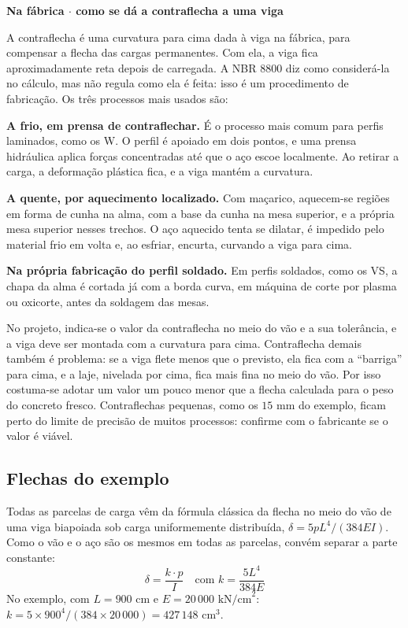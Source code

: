 \documentclass[11pt,a4paper]{article}
\newcommand{\caixaconceito}[2]{%
  \par\vspace{6pt}\noindent\colorbox{calloutbg}{%
    \parbox{\dimexpr\linewidth-2\fboxsep\relax}{%
      \vspace{4pt}\textbf{\color{primary}#1}\par\vspace{3pt}#2\vspace{4pt}%
    }%
  }\par\vspace{6pt}%
}
\begin{document}
\caixaconceito{Na fábrica $\cdot$ como se dá a contraflecha a uma viga}{%
A contraflecha é uma curvatura para cima dada à viga na fábrica, para compensar a flecha das cargas permanentes. Com ela, a viga fica aproximadamente reta depois de carregada. A NBR 8800 diz como considerá-la no cálculo, mas não regula como ela é feita: isso é um procedimento de fabricação. Os três processos mais usados são:\par\vspace{4pt}
\textbf{A frio, em prensa de contraflechar.} É o processo mais comum para perfis laminados, como os W. O perfil é apoiado em dois pontos, e uma prensa hidráulica aplica forças concentradas até que o aço escoe localmente. Ao retirar a carga, a deformação plástica fica, e a viga mantém a curvatura.\par
\textbf{A quente, por aquecimento localizado.} Com maçarico, aquecem-se regiões em forma de cunha na alma, com a base da cunha na mesa superior, e a própria mesa superior nesses trechos. O aço aquecido tenta se dilatar, é impedido pelo material frio em volta e, ao esfriar, encurta, curvando a viga para cima.\par
\textbf{Na própria fabricação do perfil soldado.} Em perfis soldados, como os VS, a chapa da alma é cortada já com a borda curva, em máquina de corte por plasma ou oxicorte, antes da soldagem das mesas.\par\vspace{4pt}
No projeto, indica-se o valor da contraflecha no meio do vão e a sua tolerância, e a viga deve ser montada com a curvatura para cima. Contraflecha demais também é problema: se a viga flete menos que o previsto, ela fica com a ``barriga'' para cima, e a laje, nivelada por cima, fica mais fina no meio do vão. Por isso costuma-se adotar um valor um pouco menor que a flecha calculada para o peso do concreto fresco. Contraflechas pequenas, como os $15\text{ mm}$ do exemplo, ficam perto do limite de precisão de muitos processos: confirme com o fabricante se o valor é viável.}

\subsection{Flechas do exemplo}

Todas as parcelas de carga vêm da fórmula clássica da flecha no meio do vão de uma viga biapoiada sob carga uniformemente distribuída, $\delta = 5 p L^4/(384 E I)$. Como o vão e o aço são os mesmos em todas as parcelas, convém separar a parte constante:
\begin{equation}
  \delta = \frac{k\cdot p}{I} \quad \text{com } k = \frac{5 L^4}{384 E}
  \label{eq:flecha-k}
\end{equation}
No exemplo, com $L = 900\text{ cm}$ e $E = 20\,000\text{ kN/cm}^2$: $k = 5 \times 900^4/(384 \times 20\,000) = 427\,148\text{ cm}^3$.
\end{document}
